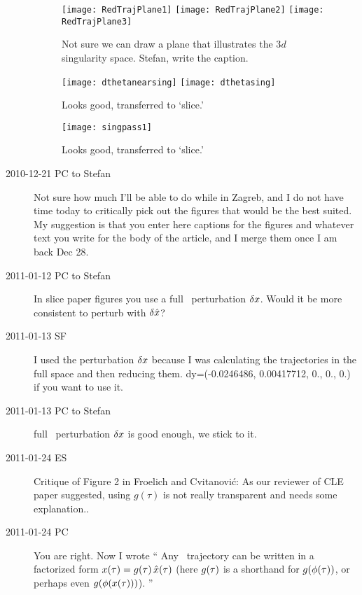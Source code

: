 \begin{description}
 \begin{figure}
 \texttt{[image: RedTrajPlane1]}%
 \texttt{[image: RedTrajPlane2]}%
 \texttt{[image: RedTrajPlane3]}%
 \caption{\label{fig:RedTrajPlane1}
Not sure we can draw a plane that illustrates the
3$d$ singularity space.
Stefan, write the caption.
 }%
 \end{figure}

 \begin{figure}
 \texttt{[image: dthetanearsing]}%
 \texttt{[image: dthetasing]}%
 \caption{\label{fig:dthetanearsing}
Looks good, transferred to `slice.'
 }%
 \end{figure}

 \begin{figure}
 \texttt{[image: singpass1]}%
 \caption{\label{fig:singpass1}
Looks good, transferred to `slice.'
 }%
 \end{figure}

\item[2010-12-21 PC to Stefan] Not sure how much I'll be able to do while
in Zagreb, and I do not have time today to critically pick out the
figures that would be the best suited. My suggestion is that you enter
here captions for the figures and whatever text you write for the body of
the article, and I merge them once I am back Dec 28.

\item[2011-01-12 PC to Stefan]
In slice paper figures
you use a full \statesp\ perturbation $\delta x$. Would it be more consistent
to perturb with $\delta \hat{x}$?

\item[2011-01-13 SF]
I used the perturbation $\delta x$ because I was calculating
    the trajectories in the full space and then reducing them.
    dy=(-0.0246486, 0.00417712, 0., 0., 0.) if you want to use it.

\item[2011-01-13 PC to Stefan]
full \statesp\ perturbation $\delta x$ is good enough, we stick to it.

\item[2011-01-24 ES] Critique of Figure 2 in Froelich and Cvitanovi\'c: As our
reviewer of CLE paper suggested, using $g(\tau)$ is not really transparent and
needs some explanation..

\item[2011-01-24 PC]
You are right. Now I wrote ``
Any \statesp\ trajectory can be written in a factorized
form $x(\tau)=g(\tau)\,\hat{x}(\tau)$
(here $g(\tau)$ is a shorthand for $g({\bf \phi}(\tau))$,
or perhaps even $g({\bf \phi}(x(\tau)))$).
''


\end{description}
